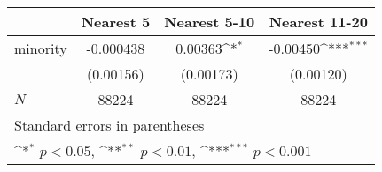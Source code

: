 {
\def\sym#1{\ifmmode^{#1}\else\(^{#1}\)\fi}
\begin{tabular}{l*{3}{c}}
\hline\hline
            &\multicolumn{1}{c}{Nearest 5}&\multicolumn{1}{c}{Nearest 5-10}&\multicolumn{1}{c}{Nearest 11-20}\\
\hline
minority    &   -0.000438         &     0.00363\sym{*}  &    -0.00450\sym{***}\\
            &   (0.00156)         &   (0.00173)         &   (0.00120)         \\
\hline
\(N\)       &       88224         &       88224         &       88224         \\
\hline\hline
\multicolumn{4}{l}{\footnotesize Standard errors in parentheses}\\
\multicolumn{4}{l}{\footnotesize \sym{*} \(p<0.05\), \sym{**} \(p<0.01\), \sym{***} \(p<0.001\)}\\
\end{tabular}
}
